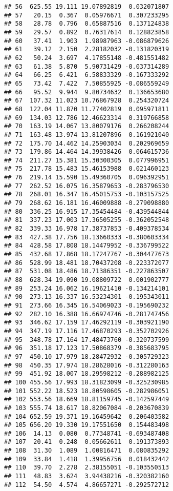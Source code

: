 \documentclass[]{book}
\theoremstyle{definition}
\theoremstyle{definition}
\theoremstyle{definition}
\theoremstyle{remark}
\begin{document}
\begin{verbatim}
## 56  625.55 19.111 19.07892819  0.032071807
## 57   20.15  0.367  0.05976671  0.307233295
## 58   28.78  0.796  0.65887516  0.137124838
## 59   29.57  0.892  0.76317614  0.128823858
## 60   37.41  1.903  1.98987963 -0.086879626
## 61   39.12  2.150  2.28182032 -0.131820319
## 62   50.24  3.697  4.17855148 -0.481551482
## 63   61.38  5.870  5.90731429 -0.037314289
## 64   66.25  6.421  6.58833329 -0.167333292
## 65   73.42  7.422  7.50855925 -0.086559249
## 66   95.52  9.944  9.80734632  0.136653680
## 67  107.32 11.023 10.76867928  0.254320724
## 68  122.04 11.870 11.77402819  0.095971811
## 69  134.03 12.786 12.46623314  0.319766858
## 70  163.19 14.067 13.80079176  0.266208244
## 71  163.48 13.974 13.81207896  0.161921040
## 72  175.70 14.462 14.25903034  0.202969659
## 73  179.86 14.464 14.39938426  0.064615736
## 74  211.27 15.381 15.30300305  0.077996951
## 75  217.78 15.483 15.46153988  0.021460123
## 76  219.14 15.590 15.49360705  0.096392951
## 77  262.52 16.075 16.35879653 -0.283796530
## 78  268.01 16.347 16.45015753 -0.103157525
## 79  268.62 16.181 16.46009888 -0.279098880
## 80  336.25 16.915 17.35454484 -0.439544844
## 81  337.23 17.003 17.36505255 -0.362052548
## 82  339.33 16.978 17.38737853 -0.409378534
## 83  427.38 17.756 18.13660333 -0.380603334
## 84  428.58 17.808 18.14479952 -0.336799522
## 85  432.68 17.868 18.17247767 -0.304477673
## 86  528.99 18.481 18.70437208 -0.223372077
## 87  531.08 18.486 18.71386351 -0.227863507
## 88  628.34 19.090 19.08809722  0.001902777
## 89  253.24 16.062 16.19621410 -0.134214101
## 90  273.13 16.337 16.53234301 -0.195343011
## 91  273.66 16.345 16.54069023 -0.195690232
## 92  282.10 16.388 16.66974746 -0.281747456
## 93  346.62 17.159 17.46292119 -0.303921190
## 94  347.19 17.116 17.46870293 -0.352702926
## 95  348.78 17.164 17.48473760 -0.320737599
## 96  351.18 17.123 17.50868379 -0.385683795
## 97  450.10 17.979 18.28472932 -0.305729323
## 98  450.35 17.974 18.28628016 -0.312280163
## 99  451.92 18.007 18.29598212 -0.288982125
## 100 455.56 17.993 18.31823099 -0.325230985
## 101 552.22 18.523 18.80598605 -0.282986051
## 102 553.56 18.669 18.81159745 -0.142597449
## 103 555.74 18.617 18.82067084 -0.203670839
## 104 652.59 19.371 19.16459642  0.206403582
## 105 656.20 19.330 19.17551650  0.154483498
## 106  14.13  0.080  0.77348741 -0.693487408
## 107  20.41  0.248  0.05662611  0.191373893
## 108  31.30  1.089  1.00816471  0.080835292
## 109  33.84  1.418  1.39956756  0.018432442
## 110  39.70  2.278  2.38155051 -0.103550513
## 111  48.83  3.624  3.94438216 -0.320382160
## 112  54.50  4.574  4.86657271 -0.292572712

\end{verbatim}
\end{document}
